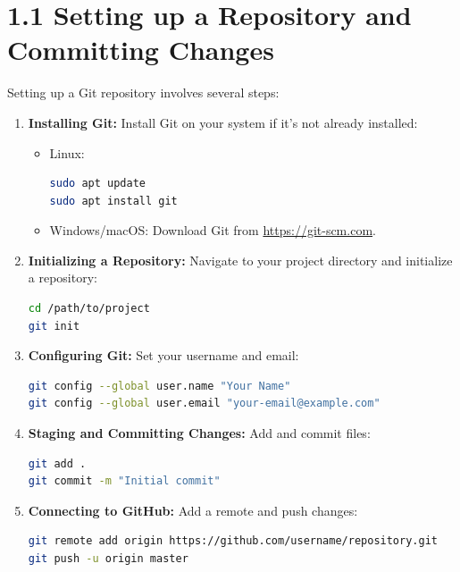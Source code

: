 \documentclass[12pt]{article}
\begin{document}
\section*{1.1 Setting up a Repository and Committing Changes}
Setting up a Git repository involves several steps:
\begin{enumerate}
    \item \textbf{Installing Git:}
    Install Git on your system if it’s not already installed:
    \begin{itemize}
        \item Linux:
        \begin{lstlisting}[language=bash]
sudo apt update
sudo apt install git
        \end{lstlisting}
        \item Windows/macOS: Download Git from \url{https://git-scm.com}.
    \end{itemize}
    \item \textbf{Initializing a Repository:}
    Navigate to your project directory and initialize a repository:
    \begin{lstlisting}[language=bash]
cd /path/to/project
git init
    \end{lstlisting}
    \item \textbf{Configuring Git:}
    Set your username and email:
    \begin{lstlisting}[language=bash]
git config --global user.name "Your Name"
git config --global user.email "your-email@example.com"
    \end{lstlisting}
    \item \textbf{Staging and Committing Changes:}
    Add and commit files:
    \begin{lstlisting}[language=bash]
git add .
git commit -m "Initial commit"
    \end{lstlisting}
    \item \textbf{Connecting to GitHub:}
    Add a remote and push changes:
    \begin{lstlisting}[language=bash]
git remote add origin https://github.com/username/repository.git
git push -u origin master
    \end{lstlisting}
\end{enumerate}
\end{document}
